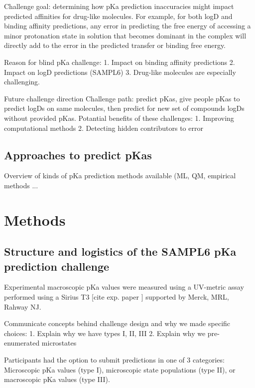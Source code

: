 \documentclass[9pt,lineno,final]{elife}
\begin{document}
Challenge goal: determining how pKa prediction inaccuracies might impact predicted affinities for drug-like molecules. For example, for both logD and binding affinity predictions, any error in predicting the free energy of accessing a minor protonation state in solution that becomes dominant in the complex will directly add to the error in the predicted transfer or binding free energy. 

Reason for blind pKa challenge:  
1. Impact on binding affinity predictions  
2. Impact on logD predictions (SAMPL6)  
3.  Drug-like molecules are especially challenging.  


Future challenge direction  
Challenge path: predict pKas, give people pKas to predict logDs on same molecules, then predict for new set of compounds logDs without provided pKas.  
Potantial benefits of these challenges:  
1. Improving computational methods  
2. Detecting hidden contributors to error  

\subsection{Approaches to predict pKas}

Overview of kinds of pKa prediction methods available  (ML, QM, empirical methods ... 


\section{Methods}

\subsection{Structure and logistics of the SAMPL6 pKa prediction challenge}

Experimental macroscopic pKa values were measured using a UV-metric assay performed using a Sirius T3 [cite exp. paper ]  supported by Merck, MRL,  Rahway NJ.

Communicate concepts behind challenge design and why we made specific choices:  
1. Explain why we have types I, II, III  
2. Explain why we pre-enumerated microstates  


Participants had the option to submit predictions in one of 3 categories: Microscopic pKa values (type I), microscopic state populations (type II), or macroscopic pKa values (type III).
\end{document}
